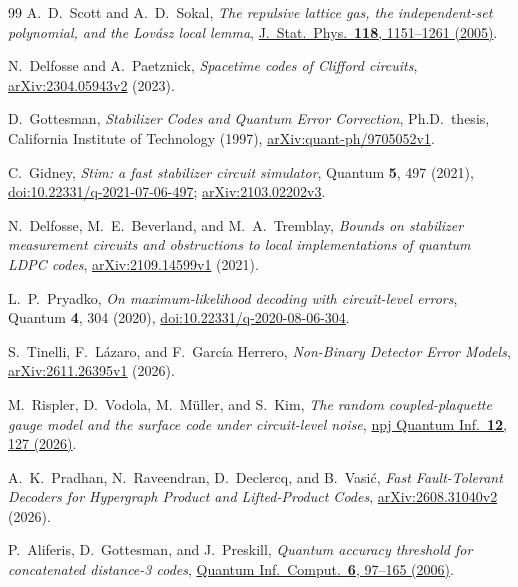 \documentclass[10pt,twocolumn]{article}
\theoremstyle{definition}
\begin{document}
\begin{thebibliography}{99}
A.~D.~Scott and A.~D.~Sokal,
\emph{The repulsive lattice gas, the independent-set polynomial,
and the Lov\'asz local lemma},
\href{https://doi.org/10.1007/s10955-004-2055-4}{J.\ Stat.\ Phys.\
\textbf{118}, 1151--1261 (2005)}.

N.~Delfosse and A.~Paetznick,
\emph{Spacetime codes of Clifford circuits},
\href{https://arxiv.org/abs/2304.05943v2}{arXiv:2304.05943v2} (2023).

D.~Gottesman,
\emph{Stabilizer Codes and Quantum Error Correction},
Ph.D.\ thesis, California Institute of Technology (1997),
\href{https://arxiv.org/abs/quant-ph/9705052v1}{arXiv:quant-ph/9705052v1}.

C.~Gidney,
\emph{Stim: a fast stabilizer circuit simulator},
Quantum \textbf{5}, 497 (2021),
\href{https://doi.org/10.22331/q-2021-07-06-497}{doi:10.22331/q-2021-07-06-497};
\href{https://arxiv.org/abs/2103.02202v3}{arXiv:2103.02202v3}.

N.~Delfosse, M.~E.~Beverland, and M.~A.~Tremblay,
\emph{Bounds on stabilizer measurement circuits and obstructions to local implementations of quantum LDPC codes},
\href{https://arxiv.org/abs/2109.14599v1}{arXiv:2109.14599v1} (2021).

L.~P.~Pryadko,
\emph{On maximum-likelihood decoding with circuit-level errors},
Quantum \textbf{4}, 304 (2020),
\href{https://doi.org/10.22331/q-2020-08-06-304}{doi:10.22331/q-2020-08-06-304}.

S.~Tinelli, F.~L\'azaro, and F.~Garc\'ia Herrero,
\emph{Non-Binary Detector Error Models},
\href{https://arxiv.org/abs/2611.26395v1}{arXiv:2611.26395v1} (2026).

M.~Rispler, D.~Vodola, M.~M\"uller, and S.~Kim,
\emph{The random coupled-plaquette gauge model and the surface code under circuit-level noise},
\href{https://doi.org/10.1038/s41534-026-01271-6}{npj Quantum Inf.\ \textbf{12}, 127 (2026)}.

A.~K.~Pradhan, N.~Raveendran, D.~Declercq, and B.~Vasi\'c,
\emph{Fast Fault-Tolerant Decoders for Hypergraph Product and Lifted-Product Codes},
\href{https://arxiv.org/abs/2608.31040v2}{arXiv:2608.31040v2} (2026).

P.~Aliferis, D.~Gottesman, and J.~Preskill,
\emph{Quantum accuracy threshold for concatenated distance-3 codes},
\href{https://doi.org/10.26421/QIC6.2-1}{Quantum Inf.\ Comput.\ \textbf{6}, 97--165 (2006)}.


\end{thebibliography}
\end{document}
